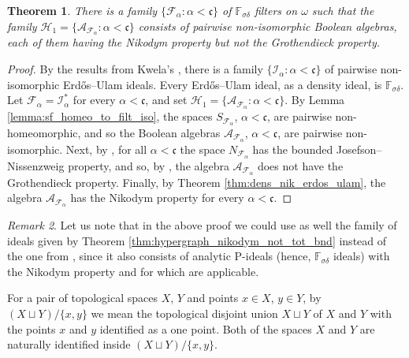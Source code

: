 \documentclass[a4paper,11pt,fleqn]{amsart}
\newtheorem{theorem}{Theorem}[section]
\theoremstyle{definition}
\theoremstyle{remark}
\newtheorem{remark}[theorem]{Remark}
\numberwithin{equation}{section}
\newcommand{\frakc}{\mathfrak{c}}
\newcommand{\aA}{\mathcal{A}}
\newcommand{\fF}{\mathcal{F}}
\newcommand{\hH}{\mathcal{H}}
\newcommand{\iI}{\mathcal{I}}
\newcommand{\erdos}{{Erd\H{o}s}}
\begin{document}
\begin{theorem}\label{thm:continuum}
There is a family $\big\{\fF_\alpha\colon \alpha<\frakc\big\}$ of $\mathbb{F}_{\sigma\delta}$ filters on $\omega$ such that the family $\hH_1=\big\{\aA_{\fF_\alpha}\colon \alpha<\frakc\big\}$ consists of pairwise non-isomorphic Boolean algebras, each of them having the Nikodym property but not the Grothendieck property.
\end{theorem}
\begin{proof}
By the results from Kwela's \cite[Section 4]{Kwe18}, there is a family $\big\{\iI_\alpha\colon\alpha<\frakc\big\}$ of pairwise non-isomorphic \erdos--Ulam ideals. Every \erdos--Ulam ideal, as a density ideal, is $\mathbb{F}_{\sigma\delta}$. Let $\fF_\alpha=\iI_\alpha^*$ for every $\alpha<\frakc$, and set $\hH_1=\big\{\aA_{\fF_\alpha}\colon\alpha<\frakc\big\}$. By Lemma \ref{lemma:sf_homeo_to_filt_iso}, the spaces $S_{\fF_\alpha}$, $\alpha<\frakc$, are pairwise non-homeomorphic, and so the Boolean algebras $\aA_{\fF_\alpha}$, $\alpha<\frakc$, are pairwise non-isomorphic. Next, by \cite[Theorem C]{MS24}, for all $\alpha<\frakc$ the space $N_{\fF_\alpha}$ has the bounded Josefson--Nissenzweig property, and so, by \cite[Corollary D]{MS24}, the algebra $\aA_{\fF_\alpha}$ does not have the Grothendieck property. Finally, by Theorem \ref{thm:dens_nik_erdos_ulam}, the algebra $\aA_{\fF_\alpha}$ has the Nikodym property for every $\alpha<\frakc$.
\end{proof}

\begin{remark}
Let us note that in the above proof we could use as well the family of ideals given by Theorem \ref{thm:hypergraph_nikodym_not_tot_bnd} instead of the one from \cite[Section 4]{Kwe18}, since it also consists of analytic P-ideals (hence, $\mathbb{F}_{\sigma\delta}$ ideals) with the Nikodym property and for which \cite[Theorem C  and Corollary D]{MS24} are applicable.
\end{remark}

\medskip

For a pair of topological spaces $X$, $Y$ and points $x\in X$, $y\in Y$, by $(X\sqcup Y)/\{x,y\}$ we mean the topological disjoint union $X\sqcup Y$ of $X$ and $Y$ with the points $x$ and $y$ identified as a one point. Both of the spaces $X$ and $Y$ are naturally identified inside $(X\sqcup Y)/\{x,y\}$.
\end{document}
